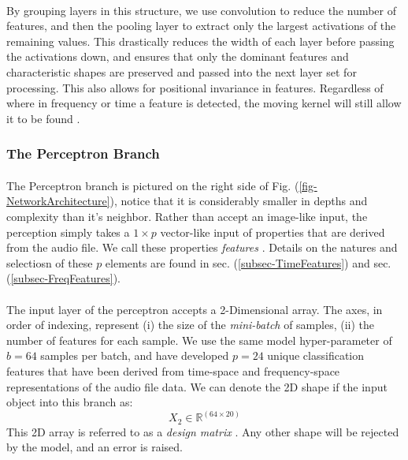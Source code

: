 \documentclass[12pt,letterpaper]{article}
\begin{document}
\paragraph*{}By grouping layers in this structure, we use convolution to reduce the number of features, and then the pooling layer to extract only the largest activations of the remaining values. This drastically reduces the width of each layer before passing the activations down, and ensures that only the dominant features and characteristic shapes are preserved and passed into the next layer set for processing. This also allows for positional invariance in features. Regardless of where in frequency or time a feature is detected, the moving kernel will still allow it to be found \cite{Goodfellow,Loy}.


\subsubsection{The Perceptron Branch}

\paragraph*{} The Perceptron branch is pictured on the right side of Fig. (\ref{fig-NetworkArchitecture}), notice that it is considerably smaller in depths and complexity than it's neighbor. Rather than accept an image-like input, the perception simply takes a $1 \times p$ vector-like input of properties that are derived from the audio file. We call these properties \textit{features} \cite{Geron,Khan,Serizel}. Details on the natures and selectiosn of these $p$ elements are found in sec. (\ref{subsec-TimeFeatures}) and sec. (\ref{subsec-FreqFeatures}).

\paragraph*{}The input layer of the perceptron accepts a 2-Dimensional array. The axes, in order of indexing, represent (i) the size of the \textit{mini-batch} of samples, (ii) the number of features for each sample. We use the same model hyper-parameter of $b = 64$ samples per batch, and have developed $p = 24$ unique classification features that have been derived from time-space and frequency-space representations of the audio file data. We can denote the 2D shape if the input object into this branch as:
\begin{equation}
\label{eqn-shapeX2}
X_2 \in \mathbb{R}^{(64 \times 20)}
\end{equation}
This 2D array is referred to as a \textit{design matrix} \cite{James,Loy}. Any other shape will be rejected by the model, and an error is raised.
\end{document}
